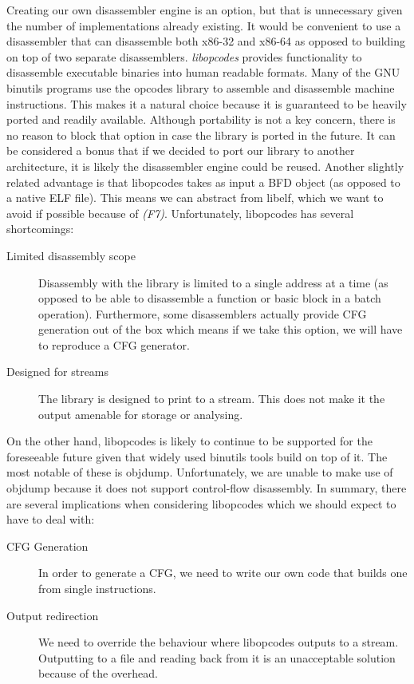 Creating our own disassembler engine is an option, but that is unnecessary given the number of implementations already existing. It would be convenient to use a disassembler that can disassemble both x86-32 and x86-64 as opposed to building on top of two separate disassemblers. \emph{libopcodes} provides functionality to disassemble executable binaries into human readable formats. Many of the GNU binutils programs use the opcodes library to assemble and disassemble machine instructions. This makes it a natural choice because it is guaranteed to be heavily ported and readily available. Although portability is not a key concern, there is no reason to block that option in case the library is ported in the future. It can be considered a bonus that if we decided to port our library to another architecture, it is likely the disassembler engine could be reused. Another slightly related advantage is that libopcodes takes as input a BFD object (as opposed to a native ELF file). This means we can abstract from libelf, which we want to avoid if possible because of \emph{(F7)}. Unfortunately, libopcodes has several shortcomings:

\begin{description}
\item [Limited disassembly scope] Disassembly with the library is limited to a single address at a time (as opposed to be able to disassemble a function or basic block in a batch operation). Furthermore, some disassemblers actually provide CFG generation out of the box which means if we take this option, we will have to reproduce a CFG generator.
\item [Designed for streams] The library is designed to print to a stream. This does not make it the output amenable for storage or analysing.
\end{description}

On the other hand, libopcodes is likely to continue to be supported for the foreseeable future given that widely used binutils tools build on top of it. The most notable of these is objdump. Unfortunately, we are unable to make use of objdump because it does not support control-flow disassembly. In summary, there are several implications when considering libopcodes which we should expect to have to deal with:

\begin{description}
\item [CFG Generation] In order to generate a CFG, we need to write our own code that builds one from single instructions.
\item [Output redirection] We need to override the behaviour where libopcodes outputs to a stream. Outputting to a file and reading back from it is an unacceptable solution because of the overhead.
\end{description}

